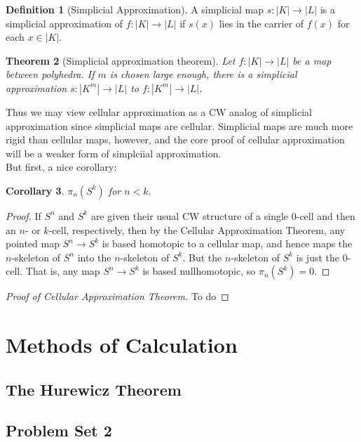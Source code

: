 \documentclass[reqno]{amsart}
\newtheorem{theorem}{Theorem}[section]
\newtheorem{corollary}[theorem]{Corollary}
\theoremstyle{definition}
\newtheorem{definition}[theorem]{Definition}
\theoremstyle{remark}
\begin{document}
\begin{definition}[Simplicial Approximation]
    A simplicial map $s \colon \left| K \right| 
    \to \left| L \right| $ is a simplicial approximation of 
    $f \colon \left| K \right|  \to \left| L \right| $ 
    if $s(x)$ lies in the carrier of $f(x)$ for
    each $x \in \left| K \right| $.
\end{definition}

\begin{theorem}[Simplicial approximation theorem]
    Let $f \colon \left| K \right| \to 
    \left| L \right| $ be a map between polyhedra.
    If $m$ is chosen large enough, there is a simplicial
    approximation $s \colon \left| K^{m} \right| \to 
    \left| L \right| $ to $f \colon \left| K^{m} \right| 
    \to \left| L \right| $.
\end{theorem}

Thus we may view cellular approximation as
a CW analog of simplicial approximation since simplicial
maps are cellular. Simplicial maps are much more rigid
than cellular maps, however, and the core
proof of cellular approximation will be
a weaker form of simplciial approximation.\\
\linebreak
But first, a nice corollary:

\begin{corollary}
    $\pi_n \left( S^{k} \right) $ for
    $n<k$.
\end{corollary}

\begin{proof}
    If $S^{n}$ and $S^{k}$ are given their usual
    CW structure of a single $0$-cell and
    then an $n$- or $k$-cell, respectively, then by
    the Cellular Approximation Theorem, 
    any pointed map $S^{n} \to S^{k}$ is based homotopic to a 
    cellular map, and hence maps
    the  $n$-skeleton of $S^{n}$ into the $n$-skeleton
    of $S^{k}$. But the $n$-skeleton of $S^{k}$ is
    just the $0$-cell. That is, 
    any map $S^{n} \to S^{k}$ is based nullhomotopic, so
    $\pi_n \left( S^{k} \right) = 0$.
\end{proof}

\begin{proof}[Proof of Cellular Approximation Theorem]
    To do
\end{proof}


\section{Methods of Calculation}

\subsection{The Hurewicz Theorem}





\subsection{Problem Set 2}






\newpage

\printbibliography
\end{document}
